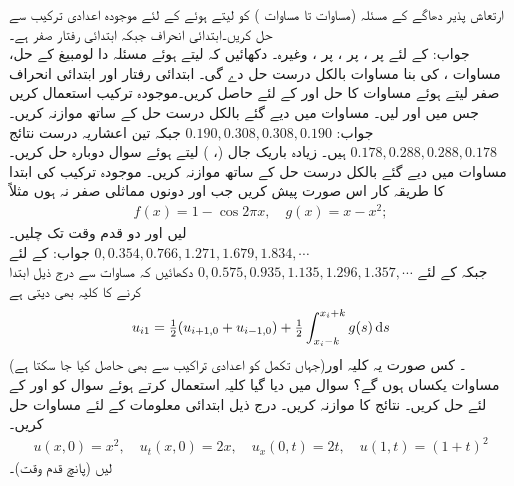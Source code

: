\quad
ارتعاش پذیر دھاگے کے مسئلہ (مساوات  تا مساوات ) کو  لیتے ہوئے  کے لئے موجودہ اعدادی ترکیب سے حل کریں۔ابتدائی انحراف جبکہ ابتدائی رفتار صفر ہے۔\\
جواب:\quad
{} کے لئے  پر ،  پر ،  پر ، وغیرہ۔
\quad
دکھائیں کہ  لیتے ہوئے  مسئلہ دا لومبیغ  کے حل، مساوات ، کی بنا مساوات  بالکل درست حل  دے گی۔
\quad
ابتدائی رفتار  اور ابتدائی انحراف صفر  لیتے ہوئے مساوات  کا حل  اور  کے لئے حاصل کریں۔موجودہ ترکیب استعمال کریں جس میں  اور  لیں۔ مساوات  میں دیے گئے بالکل درست حل کے ساتھ موازنہ کریں۔\\
جواب:\quad
$0.190,0.308,0.308,0.190$ 
جبکہ تین اعشاریہ درست نتائج 
$0.178,0.288,0.288,0.178$
ہیں۔
\quad
زیادہ باریک جال (، ) لیتے ہوئے سوال  دوبارہ حل کریں۔مساوات  میں دیے گئے بالکل درست حل کے ساتھ موازنہ کریں۔
\quad
موجودہ ترکیب کی ابتدا کا طریقہ کار اس صورت پیش کریں جب  اور  دونوں مماثلی صفر نہ ہوں مثلاً
\begin{align*}
f(x)=1-\cos 2\pi x,\quad g(x)=x-x^2;
\end{align*} 
 لیں اور دو قدم وقت تک چلیں۔\\
جواب:\quad
{} کے لئے
$0,0.354,0.766,1.271,1.679,1.834,\cdots$\\
جبکہ  کے لئے
$0,0.575,0.935,1.135,1.296,1.357,\cdots$ 
\quad
دکھائیں کہ مساوات  سے درج ذیل ابتدا کرنے کا کلیہ بھی دیتی ہے
\begin{align*}
u_{i1}=\tfrac{1}{2}(u_{i+1,0}+u_{i-1,0})+\tfrac{1}{2}\int_{x_i-k}^{x_i+k}g(s)\dif s
\end{align*}
(جہاں تکمل کو اعدادی تراکیب سے بھی حاصل کیا جا سکتا ہے)۔ کس صورت یہ کلیہ اور مساوات  یکساں ہوں گے؟
\quad
سوال  میں دیا گیا کلیہ استعمال کرتے ہوئے سوال  کو   اور  کے لئے حل کریں۔ نتائج کا موازنہ کریں۔
\quad
درج ذیل ابتدائی معلومات کے لئے مساوات  حل کریں۔
\begin{align*}
u(x,0)=x^2,\quad u_t(x,0)=2x,\quad u_x(0,t)=2t,\quad u(1,t)=(1+t)^2
\end{align*}
 لیں (پانچ قدم وقت)۔

